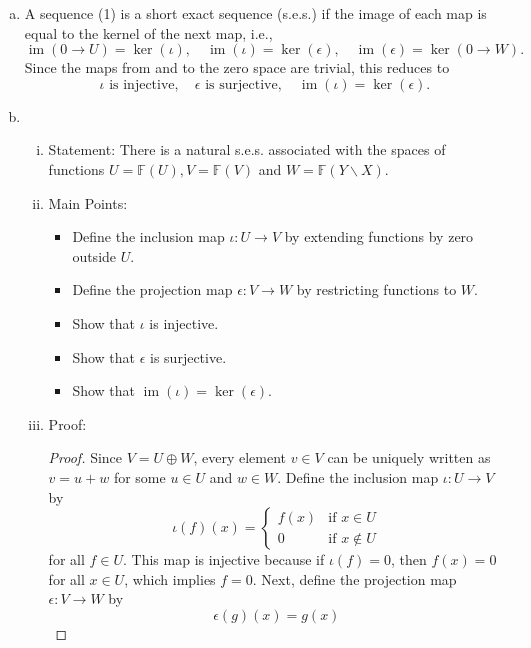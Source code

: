 \documentclass{article}
\begin{document}
\begin{enumerate}[a)]
    \item A sequence (1) is a short exact sequence (s.e.s.) if the image of each map is equal to the kernel of the next map, i.e.,
    \[
        \operatorname{im}(0 \to U) = \ker(\iota), \quad \operatorname{im}(\iota) = \ker(\epsilon), \quad \operatorname{im}(\epsilon) = \ker(0 \to W).
    \]
    Since the maps from and to the zero space are trivial, this reduces to
    \[
        \iota \text{ is injective}, \quad \epsilon \text{ is surjective}, \quad \operatorname{im}(\iota) = \ker(\epsilon).
    \]
    \item \begin{enumerate}[i)]
        \item Statement: There is a natural s.e.s. associated with the spaces of functions $U = \mathbb{F}(U), V = \mathbb{F}(V)$ and $W = \mathbb{F}(Y \backslash X)$.
        \item Main Points:
            \begin{itemize}
                \item Define the inclusion map $\iota: U \to V$ by extending functions by zero outside $U$.
                \item Define the projection map $\epsilon: V \to W$ by restricting functions to $W$.
                \item Show that $\iota$ is injective.
                \item Show that $\epsilon$ is surjective.
                \item Show that $\operatorname{im}(\iota) = \ker(\epsilon)$.
            \end{itemize}
        \item Proof:
        \begin{proof}
            Since $V = U \oplus W$, every element $v \in V$ can be uniquely written as $v = u + w$ for some $u \in U$ and $w \in W$. Define the inclusion map $\iota: U \to V$ by
            \[
                \iota(f)(x) = \begin{cases}
                    f(x) & \text{if } x \in U \\
                    0 & \text{if } x \notin U
                \end{cases}
            \]
            for all $f \in U$. This map is injective because if $\iota(f) = 0$, then $f(x) = 0$ for all $x \in U$, which implies $f = 0$. Next, define the projection map $\epsilon: V \to W$ by
            \[
                \epsilon(g)(x) = g(x)
            \]

\end{proof}
\end{enumerate}
\end{enumerate}
\end{document}
